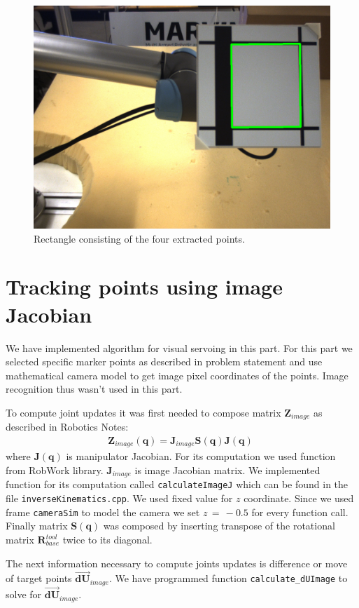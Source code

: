 \documentclass[]{scrartcl}
\begin{document}
\begin{figure}
	\centering
	\includegraphics[width=0.7\linewidth]{fig/src1-1.png}
	\caption{Rectangle consisting of the four extracted points.}
	\label{fig:src2}
\end{figure}

\clearpage
\section{Tracking points using image Jacobian}
We have implemented algorithm for visual servoing in this part. For this part we selected specific marker points as described in problem statement and use mathematical camera model to get image pixel coordinates of the points. Image recognition thus wasn't used in this part.

To compute joint updates it was first needed to compose matrix $\boldsymbol{Z}_{image}$ as described in Robotics Notes:
\begin{align}
	\boldsymbol{Z}_{image}(\boldsymbol{q}) = \boldsymbol{J}_{image}\boldsymbol{S}(\boldsymbol{q})\boldsymbol{J}(\boldsymbol{q})\; 
\end{align}
where $\boldsymbol{J}(\boldsymbol{q})$ is manipulator Jacobian. For its computation we used function from RobWork library. $\boldsymbol{J}_{image}$ is image Jacobian matrix. We implemented function for its computation called \texttt{calculateImageJ} which can be found in the file \texttt{inverseKinematics.cpp}. We used fixed value for $z$ coordinate. Since we used frame \texttt{cameraSim} to model the camera we set $z\, = \, -0.5$ for every function call. Finally matrix $\boldsymbol{S}(\boldsymbol{q})$ was composed by inserting transpose of the rotational matrix $\boldsymbol{R}_{base}^{tool}$ twice to its diagonal.

The next information necessary to compute joints updates is difference or move of target points $\overrightarrow{\boldsymbol{dU}}_{image}$. We have programmed function \texttt{calculate\_dUImage} to solve for $\overrightarrow{\boldsymbol{dU}}_{image}$.
\end{document}
